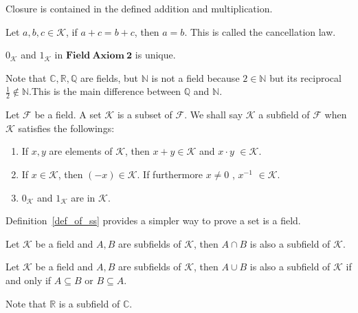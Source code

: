 \documentclass[a4paper]{ctexart}
\begin{document}
	\begin{myrmk}
		Closure is contained in the defined addition and multiplication.
	\end{myrmk}
	\begin{mythm}
		Let $a,b,c \in \mathcal{K}$, if $a+c=b+c$, then $a=b$. This is called the cancellation law.
	\end{mythm}
	\begin{mythm}
		$0_\mathcal{K}$ and $1_\mathcal{K}$ in $\mathbf{Field\ Axiom\ 2}$ is unique.
	\end{mythm}
	\begin{myex}
		Note that $\mathbb{C,R,Q}$ are fields, but $\mathbb{N}$ is not a field because $2 \in \mathbb{N}$ but its reciprocal $\frac{1}{2} \notin \mathbb{N}$.This is the main difference between $\mathbb{Q}$ and $\mathbb{N}$.
	\end{myex}
	\begin{mydef}\label{def_of_ss}
		Let $\mathcal{F}$ be a field. A set $\mathcal{K}$ is a subset of $\mathcal{F}$. We shall say $\mathcal{K}$ a subfield of $\mathcal{F}$ when $\mathcal{K}$ satisfies the followings:
		\begin{enumerate}
			\item If $x,y$ are elements of $\mathcal{K}$, then  $x+y\in \mathcal{K}$ and $x\cdot y$ $\in \mathcal{K}$.
			\item If $x\in \mathcal{K}$, then $(-x)\in \mathcal{K}$. If furthermore $x\neq 0$ , $x^{-1}$ $\in \mathcal{K}$.
			\item $0_\mathcal{K}$ and $1_\mathcal{K}$ are in $\mathcal{K}$.
		\end{enumerate}
	\end{mydef}
	\begin{myrmk}
		Definition~\ref{def_of_ss} provides a simpler way to prove a set is a field.
	\end{myrmk}
	\begin{mypro}
		Let $\mathcal{K}$ be a field and $A,B$ are subfields of $\mathcal{K}$, then $A \cap B$ is also a subfield of $\mathcal{K}$.
	\end{mypro}
	\begin{mypro}
		Let $\mathcal{K}$ be a field and $A,B$ are subfields of $\mathcal{K}$, then $A \cup B$ is also a subfield of $\mathcal{K}$ if and only if $A \subseteq B$ or $B \subseteq A$.
	\end{mypro}
	\begin{myex}
		Note that $\mathbb{R}$ is a subfield of $\mathbb{C}$.
	\end{myex}
\end{document}
